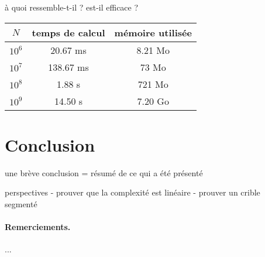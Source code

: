 \documentclass[a4paper]{easychair}
\begin{document}
à quoi ressemble-t-il ?
est-il efficace ?

\begin{center}
  \begin{tabular}{|c|c|c|}
    \hline
    $N$ & temps de calcul & mémoire utilisée \\
    \hline\hline
    $10^6$ & 20.67 ms & 8.21 Mo \\\hline
    $10^7$ & 138.67 ms & 73 Mo \\\hline
    $10^8$ & 1.88 s & 721 Mo \\\hline
    $10^9$ & 14.50 s & 7.20 Go \\\hline
  \end{tabular}
\end{center}

\section{Conclusion}
\label{sec:conclusion}

une brève conclusion = résumé de ce qui a été présenté

perspectives
- prouver que la complexité est linéaire
- prouver un crible segmenté~\cite{crible-segmente}


\paragraph{Remerciements.} ...



\end{document}
